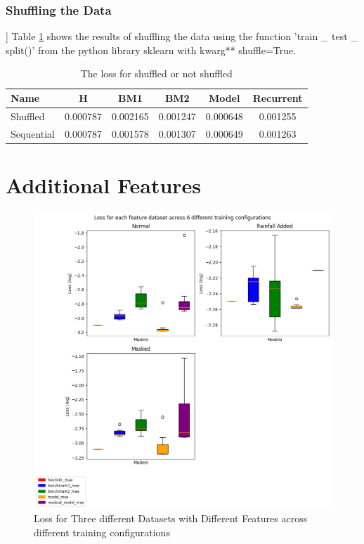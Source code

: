 \subsubsection*{Shuffling the Data}]
Table \ref{tab:suffle} shows the results of shuffling the data using the function 'train \_ test \_ split()' from the python library sklearn with kwarg** shuffle=True.
\begin{table}[h]
	\centering
	\caption{The loss for shuffled or not shuffled}
	\label{tab:suffle}
	\begin{tabular}{p{2cm}ccccc}
		\toprule
		Name &  H &  BM1 &  BM2 &  Model &  Recurrent \\
		\midrule
		Shuffled &       0.000787 &        0.002165 &        0.001247 &   0.000648 &            0.001255 \\
		Sequential &       0.000787 &        0.001578 &        0.001307 &   0.000649 &            0.001263 \\
		\bottomrule
	\end{tabular}
\end{table}

\section{Additional Features}

\begin{figure}[tbph]
	\centering
	\includegraphics[width=0.7\linewidth, height=0.5\textheight]{Figures/Results/feature_manip/feature_manip_across_lr}
	\caption[Loss For Three different Datasets With Different Features]{Loss for Three different Datasets with Different Features across different training configurations}
	\label{fig:norm-rain-mask-init}
\end{figure}


